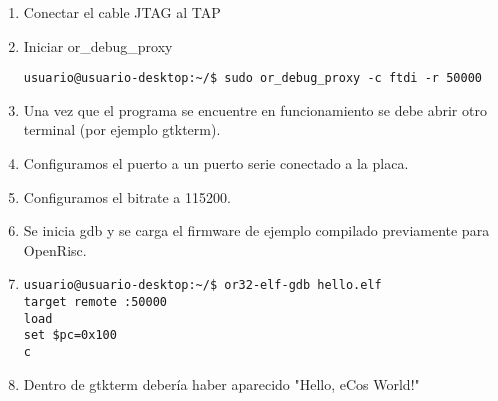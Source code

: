 \begin{enumerate}

\item Conectar el cable JTAG al TAP
\item Iniciar or\_debug\_proxy

\begin{lstlisting}[breaklines]
usuario@usuario-desktop:~/$ sudo or_debug_proxy -c ftdi -r 50000 
\end{lstlisting}

\item Una vez que el programa se encuentre en funcionamiento se debe abrir otro terminal (por ejemplo gtkterm).
\item Configuramos el puerto a un puerto serie conectado a la placa.
\item Configuramos el bitrate a 115200.

\item Se inicia gdb y se carga el firmware de ejemplo compilado previamente para OpenRisc.

\item 
\begin{lstlisting}[breaklines]
usuario@usuario-desktop:~/$ or32-elf-gdb hello.elf
target remote :50000
load
set $pc=0x100
c
\end{lstlisting}

\item Dentro de gtkterm debería haber aparecido "Hello, eCos World!" 

\end{enumerate}
